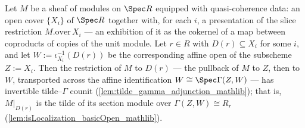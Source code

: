 \begin{lemma}
  \label{lem:isIso_fromTildeΓ_basicOpen_of_quasicoherent}
  \leanok
  Let \(M\) be a sheaf of modules on \(\Spec R\) equipped with quasi-coherence data: an
  open cover \(\{X_i\}\) of \(\Spec R\) together with, for each \(i\), a presentation of
  the slice restriction \(M.\mathrm{over}\,X_i\) — an exhibition of it as the cokernel of
  a map between coproducts of copies of the unit module. Let \(r \in R\) with
  \(D(r) \subseteq X_i\) for some \(i\), and let \(W := \iota_{X_i}^{-1}(D(r))\) be the
  corresponding affine open of the subscheme \(Z := X_i\). Then the restriction of \(M\)
  to \(D(r)\) — the pullback of \(M\) to \(Z\), then to \(W\), transported across the
  affine identification \(W \cong \Spec\Gamma(Z, W)\) — has invertible
  tilde--\(\Gamma\) counit (\cref{lem:tilde_gamma_adjunction_mathlib}); that is,
  \(M|_{D(r)}\) is the tilde of its section module over
  \(\Gamma(Z, W) \cong R_r\) (\cref{lem:isLocalization_basicOpen_mathlib}).
\end{lemma}
